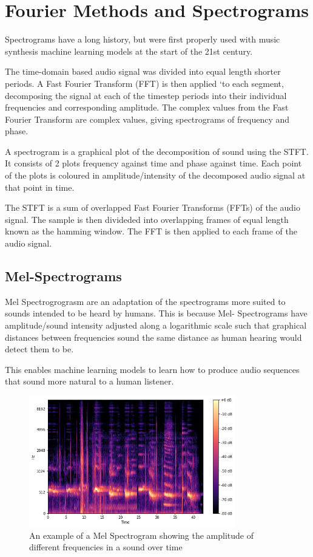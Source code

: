 \section{Fourier Methods and Spectrograms}

Spectrograms have a long history, but were first properly used with music synthesis machine learning models at the start of the 21st century\cite{NoteOnsetDetection}.

The time-domain based audio signal was divided into equal length shorter periods. A Fast Fourier Transform (FFT) is then applied `to each segment, decomposing the signal at each of the timestep periods into their individual frequencies and corresponding amplitude. The complex values from the Fast Fourier Transform are complex values, giving spectrograms of frequency and phase.

A spectrogram is a graphical plot of the decomposition of sound using the \acrfull{STFT}. It consists of 2 plots frequency against time and phase against time. Each point of the plots is coloured in amplitude/intensity of the decomposed audio signal at that point in time.

The STFT is a sum of overlapped Fast Fourier Transforms (FFTs) of the audio signal. The sample is then divideded into overlapping frames of equal length known as the hamming window. The FFT is then applied to each frame of the audio signal. 

\subsection{Mel-Spectrograms}

Mel Spectrogrograsm are an adaptation of the spectrograms more suited to  sounds intended to be heard by humans. This is because Mel- Spectrograms have amplitude/sound intensity adjusted along a logarithmic scale such that graphical distances between frequencies sound the same distance as human hearing would detect them to be.

This enables machine learning models to learn how to produce audio sequences that sound more natural to a human listener.

\begin{figure}
    \centering
    \includegraphics[width=0.8\textwidth]{literature_review/MelSpectrogram.png}
    \caption{An example of a  Mel Spectrogram showing the amplitude of different frequencies in a sound over time\cite{GettingToKnowTheMelSpectrogram}}
    \label{fig:spectrograms}
\end{figure}

